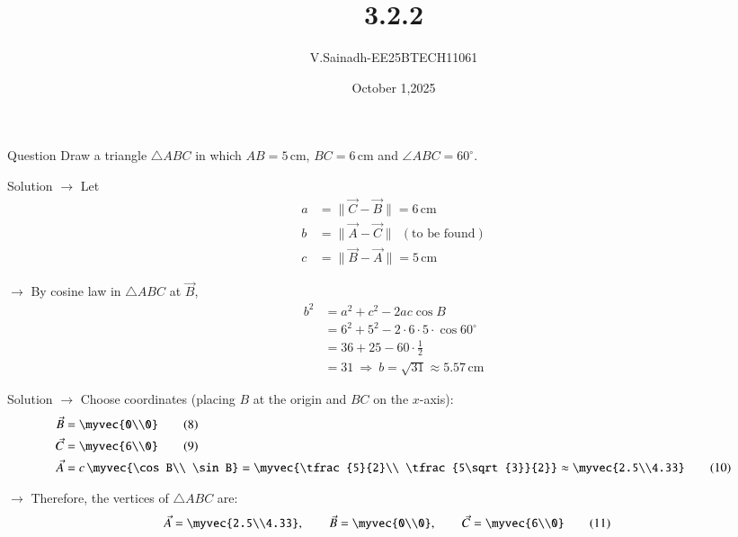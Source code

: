 \documentclass{beamer}
\begin{document}
\title 
{3.2.2}
\date{October 1,2025}
\author 
{V.Sainadh-EE25BTECH11061}
\frame{\titlepage}
\begin{frame}{Question}
Draw a triangle $\triangle ABC$ in which $AB=5\,\text{cm}$, $BC=6\,\text{cm}$ and $\angle ABC=60^\circ$.\\[2pt]
\end{frame}
\begin{frame}{Solution}
$\rightarrow$ Let
\begin{align}
a &= \|\vec{C}-\vec{B}\| = 6\,\text{cm} \tag{1}\\
b &= \|\vec{A}-\vec{C}\| \ \ (\text{to be found}) \tag{2}\\
c &= \|\vec{B}-\vec{A}\| = 5\,\text{cm} \tag{3}
\end{align}

$\rightarrow$ By cosine law in $\triangle ABC$ at $\vec{B}$,
\begin{align}
b^{2} &= a^{2}+c^{2}-2ac\cos B \tag{4}\\
      &= 6^{2}+5^{2}-2\cdot6\cdot5\cdot\cos60^\circ \tag{5}\\
      &= 36+25-60\cdot\frac12 \tag{6}\\
      &= 31 \ \Rightarrow\ b=\sqrt{31}\approx 5.57\,\text{cm} \tag{7}
\end{align}
  \end{frame}
  \begin{frame}{Solution}
  $\rightarrow$ Choose coordinates (placing $B$ at the origin and $BC$ on the $x$-axis):
\begin{align}
\vec{B} &= \myvec{0\\0} \tag{8}\\
\vec{C} &= \myvec{6\\0} \tag{9}\\
\vec{A} &= c\,\myvec{\cos B\\ \sin B}
       = \myvec{\tfrac{5}{2}\\ \tfrac{5\sqrt{3}}{2}}
       \approx \myvec{2.5\\4.33} \tag{10}
\end{align}

$\rightarrow$ Therefore, the vertices of $\triangle ABC$ are:
\begin{align}
\vec{A} &= \myvec{2.5\\4.33}, \qquad
\vec{B} = \myvec{0\\0}, \qquad
\vec{C} = \myvec{6\\0} \tag{11}
\end{align}
\enlargethispage{2\baselineskip}   

\end{frame}
\end{document}
